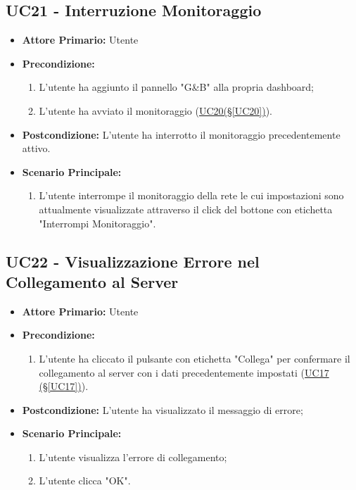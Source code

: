 \pagebreak

\subsection{UC21 - Interruzione Monitoraggio}\label{UC21}
\begin{itemize}
	\item \textbf{Attore Primario:} Utente
	\item \textbf{Precondizione:}
	\begin{enumerate}
		\item L'utente ha aggiunto il pannello "G\&B" alla propria dashboard;
		\item L'utente ha avviato il monitoraggio (\hyperref[UC20]{UC20(§\ref*{UC20})}).
	\end{enumerate}
	\item \textbf{Postcondizione:} L'utente ha interrotto il monitoraggio precedentemente attivo.
	\item \textbf{Scenario Principale:}
	\begin{enumerate}
		\item L'utente interrompe il monitoraggio della rete le cui impostazioni sono attualmente visualizzate attraverso il click del bottone con etichetta "Interrompi Monitoraggio".
	\end{enumerate}
\end{itemize}

\pagebreak

\subsection{UC22 - Visualizzazione Errore nel Collegamento al Server}\label{UC22}
\begin{itemize}
	\item \textbf{Attore Primario:}  Utente
	\item \textbf{Precondizione:}
	\begin{enumerate}
		\item L'utente ha cliccato il pulsante con etichetta "Collega" per confermare il collegamento al server con i dati precedentemente impostati (\hyperref[UC17]{UC17 (§\ref*{UC17})}).
	\end{enumerate}
	\item \textbf{Postcondizione:} L'utente ha visualizzato il messaggio di errore;
	\item \textbf{Scenario Principale:}
	\begin{enumerate}
		\item L'utente visualizza l'errore di collegamento;
		\item L'utente clicca "OK".
	\end{enumerate}
\end{itemize}

